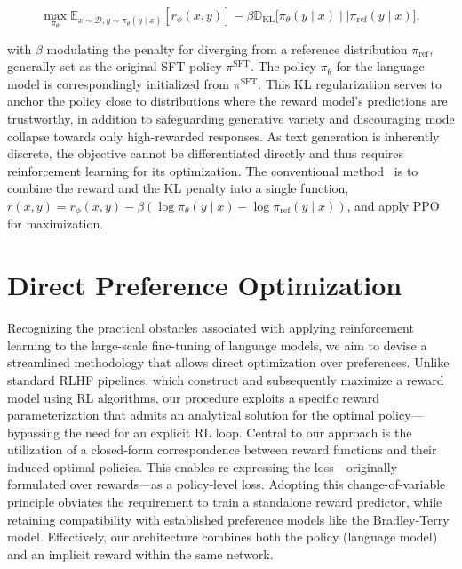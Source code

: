 \begin{equation}\label{eq:RL}
\max_{\pi_{\theta}}  \mathbb{E}_{x\sim \mathcal{D}, y\sim \pi_{\theta}(y \mid x)}\left[r_{\phi}(x, y)\right] - \beta\mathbb{D}_{\textrm{KL}}\bigl[\pi_{\theta}(y\mid x)\mid \mid \pi_\text{ref}(y\mid x)\bigr],
\end{equation}

with $\beta$ modulating the penalty for diverging from a reference distribution $\pi_\text{ref}$, generally set as the original SFT policy $\pi^\text{SFT}$. The policy $\pi_\theta$ for the language model is correspondingly initialized from $\pi^\text{SFT}$. This KL regularization serves to anchor the policy close to distributions where the reward model's predictions are trustworthy, in addition to safeguarding generative variety and discouraging mode collapse towards only high-rewarded responses. As text generation is inherently discrete, the objective cannot be differentiated directly and thus requires reinforcement learning for its optimization. The conventional method~\cite{ziegler2020finetuning, stiennon2022learning, bai2022training, ouyang2022training} is to combine the reward and the KL penalty into a single function, ${r(x, y) = r_{\phi}(x, y) -\beta (\log \pi_{\theta}(y\mid x) - \log \pi_\text{ref}(y\mid x))}$, and apply PPO~\cite{schulman2017proximal} for maximization.

\section{Direct Preference Optimization}\label{sec:DPO}

Recognizing the practical obstacles associated with applying reinforcement learning to the large-scale fine-tuning of language models, we aim to devise a streamlined methodology that allows direct optimization over preferences. Unlike standard RLHF pipelines, which construct and subsequently maximize a reward model using RL algorithms, our procedure exploits a specific reward parameterization that admits an analytical solution for the optimal policy—bypassing the need for an explicit RL loop. Central to our approach is the utilization of a closed-form correspondence between reward functions and their induced optimal policies. This enables re-expressing the loss—originally formulated over rewards—as a policy-level loss. Adopting this change-of-variable principle obviates the requirement to train a standalone reward predictor, while retaining compatibility with established preference models like the Bradley-Terry model. Effectively, our architecture combines both the policy (language model) and an implicit reward within the same network.


